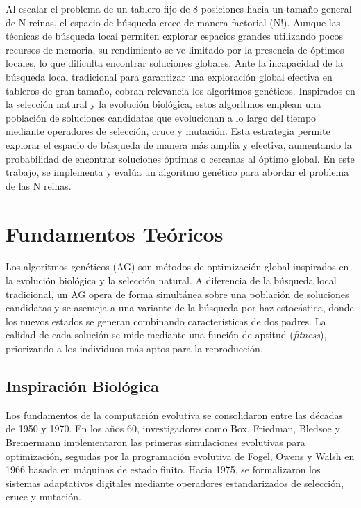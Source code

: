\documentclass[11pt,a4paper,twocolumn]{article}
\begin{document}
Al escalar el problema de un tablero fijo de 8 posiciones hacia un tamaño general de N-reinas, el espacio de búsqueda crece de manera factorial (N!). Aunque las técnicas de búsqueda local permiten explorar espacios grandes utilizando pocos recursos de memoria, su rendimiento se ve limitado por la presencia de óptimos locales, lo que dificulta encontrar soluciones globales. \cite{inaoe}
Ante la incapacidad de la búsqueda local tradicional para garantizar una exploración global efectiva en tableros de gran tamaño, cobran relevancia los algoritmos genéticos. Inspirados en la selección natural y la evolución biológica, estos algoritmos emplean una población de soluciones candidatas que evolucionan a lo largo del tiempo mediante operadores de selección, cruce y mutación. Esta estrategia permite explorar el espacio de búsqueda de manera más amplia y efectiva, aumentando la probabilidad de encontrar soluciones óptimas o cercanas al óptimo global. \cite{russell} En este trabajo, se implementa y evalúa un algoritmo genético para abordar el problema de las N reinas. 

\section{Fundamentos Teóricos}

Los algoritmos genéticos (AG) son métodos de optimización global inspirados en la evolución biológica y la selección natural. A diferencia de la búsqueda local tradicional, un AG opera de forma simultánea sobre una población de soluciones candidatas y se asemeja a una variante de la búsqueda por haz estocástica, donde los nuevos estados se generan combinando características de dos padres. La calidad de cada solución se mide mediante una función de aptitud (\textit{fitness}), priorizando a los individuos más aptos para la reproducción.

\subsection{Inspiración Biológica}
Los fundamentos de la computación evolutiva se consolidaron entre las décadas de 1950 y 1970. En los años 60, investigadores como Box, Friedman, Bledsoe y Bremermann implementaron las primeras simulaciones evolutivas para optimización, seguidas por la programación evolutiva de Fogel, Owens y Walsh en 1966 basada en máquinas de estado finito. Hacia 1975, se formalizaron los sistemas adaptativos digitales mediante operadores estandarizados de selección, cruce y mutación.
\end{document}
